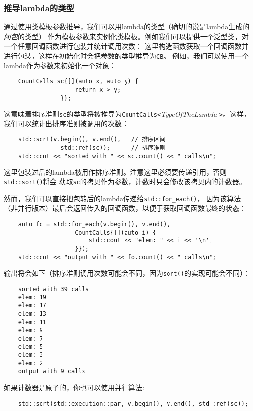 \subsubsection{推导lambda的类型}
通过使用类模板参数推导，我们可以用lambda的类型（确切的说是lambda生成的\emph{闭包}的类型）
作为模板参数来实例化类模板。例如我们可以提供一个泛型类，对一个任意回调函数进行包装并统计调用次数：
这里构造函数获取一个回调函数并进行包装，这样在初始化时会把参数的类型推导为\texttt{CB}。
例如，我们可以使用一个lambda作为参数来初始化一个对象：
\begin{lstlisting}
    CountCalls sc{[](auto x, auto y) {
                    return x > y;
                }};
\end{lstlisting}
这意味着排序准则\texttt{sc}的类型将被推导为\texttt{CountCalls<}\emph{TypeOfTheLambda}
\texttt{>}。这样，我们可以统计出排序准则被调用的次数：
\begin{lstlisting}
    std::sort(v.begin(), v.end(),   // 排序区间
                std::ref(sc));      // 排序准则
    std::cout << "sorted with " << sc.count() << " calls\n";
\end{lstlisting}
这里包装过后的lambda被用作排序准则。注意这里必须要传递引用，否则\texttt{std::sort()}将会
获取\texttt{sc}的拷贝作为参数，计数时只会修改该拷贝内的计数器。

然而，我们可以直接把包转后的lambda传递给\texttt{std::for\_each()}，
因为该算法（非并行版本）最后会返回传入的回调函数，以便于获取回调函数最终的状态：
\begin{lstlisting}
    auto fo = std::for_each(v.begin(), v.end(),
                    CountCalls{[](auto i) {
                        std::cout << "elem: " << i << '\n';
                    }});
    std::cout << "output with " << fo.count() << " calls\n";
\end{lstlisting}
输出将会如下（排序准则调用次数可能会不同，因为\texttt{sort()}的实现可能会不同）：
\begin{lstlisting}
    sorted with 39 calls
    elem: 19
    elem: 17
    elem: 13
    elem: 11
    elem: 9
    elem: 7
    elem: 5
    elem: 3
    elem: 2
    output with 9 calls
\end{lstlisting}
如果计数器是原子的，你也可以使用\hyperref[ch22]{并行算法}:
\begin{lstlisting}
    std::sort(std::execution::par, v.begin(), v.end(), std::ref(sc));
\end{lstlisting}

